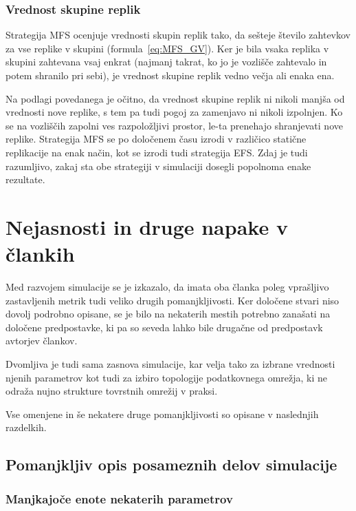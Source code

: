 \documentclass[a4paper, 12pt]{book}
\begin{document}
\subsubsection{Vrednost skupine replik}

Strategija MFS ocenjuje vrednosti skupin replik tako, da sešteje število
zahtevkov za vse replike v skupini (formula~\eqref{eq:MFS_GV}). Ker je
bila vsaka replika v skupini zahtevana vsaj enkrat (najmanj takrat, ko jo
je vozlišče zahtevalo in potem shranilo pri sebi), je vrednost skupine replik
vedno večja ali enaka ena.

Na podlagi povedanega je očitno, da vrednost skupine replik ni nikoli manjša
od vrednosti nove replike, s tem pa tudi pogoj za zamenjavo ni nikoli
izpolnjen. Ko se na vozliščih zapolni ves razpoložljivi prostor, le-ta
prenehajo shranjevati nove replike. Strategija MFS se po določenem času
izrodi v različico statične replikacije na enak način, kot se izrodi
tudi strategija EFS. Zdaj je tudi razumljivo, zakaj sta obe strategiji v
simulaciji dosegli popolnoma enake rezultate.


\section{Nejasnosti in druge napake v člankih}

Med razvojem simulacije se je izkazalo, da imata oba članka poleg vprašljivo
zastavljenih metrik tudi veliko drugih pomanjkljivosti. Ker določene stvari
niso dovolj podrobno opisane, se je bilo na nekaterih mestih
potrebno zanašati na določene predpostavke, ki pa so seveda lahko bile
drugačne od predpostavk avtorjev člankov.

Dvomljiva je tudi sama zasnova simulacije, kar velja tako za izbrane
vrednosti njenih parametrov kot tudi za izbiro topologije podatkovnega
omrežja, ki ne odraža nujno strukture tovrstnih omrežij v praksi.

Vse omenjene in še nekatere druge pomanjkljivosti so opisane v naslednjih
razdelkih.

\subsection{Pomanjkljiv opis posameznih delov simulacije}
\label{ss:sim_bad_desc}

\subsubsection{Manjkajoče enote nekaterih parametrov}
\end{document}
